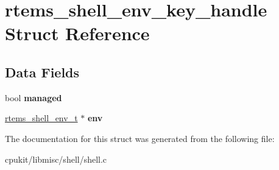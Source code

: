 \hypertarget{structrtems__shell__env__key__handle}{}\section{rtems\+\_\+shell\+\_\+env\+\_\+key\+\_\+handle Struct Reference}
\label{structrtems__shell__env__key__handle}
\subsection*{Data Fields}
\begin{DoxyCompactItemize}
\item 
\mbox{\label{structrtems__shell__env__key__handle_acf604b782b9a6490e6ddaaa129d7d9ea}} 
bool {\bfseries managed}
\item 
\mbox{\label{structrtems__shell__env__key__handle_aae400140b1b401faa83ebfe21d9455c6}} 
\mbox{\hyperlink{structrtems__shell__env__t}{rtems\+\_\+shell\+\_\+env\+\_\+t}} $\ast$ {\bfseries env}
\end{DoxyCompactItemize}


The documentation for this struct was generated from the following file\+:\begin{DoxyCompactItemize}
\item 
cpukit/libmisc/shell/shell.\+c\end{DoxyCompactItemize}
